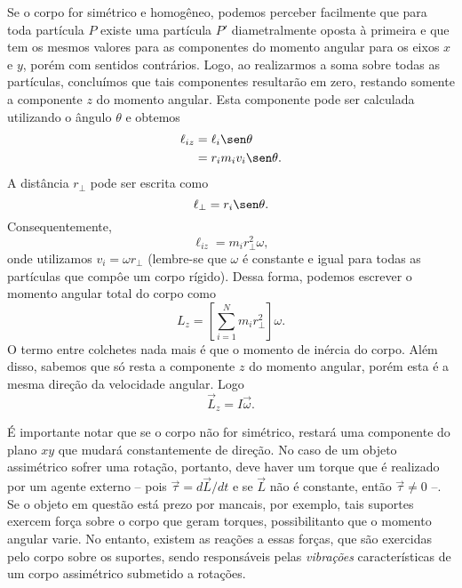 Se o corpo for simétrico e homogêneo, podemos perceber facilmente que para toda partícula $P$ existe uma partícula $P'$ diametralmente oposta à primeira e que tem os mesmos valores para as componentes do momento angular para os eixos $x$ e $y$, porém com sentidos contrários. Logo, ao realizarmos a soma sobre todas as partículas, concluímos que tais componentes resultarão em zero, restando somente a componente $z$ do momento angular. Esta componente pode ser calculada utilizando o ângulo $\theta$ e obtemos
\begin{align}
  \ell_{iz} &= \ell_i \sen\theta \\
  &= r_i m_i v_i \sen\theta.
\end{align}
%
A distância $r_{\perp}$ pode ser escrita como
\begin{equation}
  \ell_{\perp} = r_i\sen\theta.
\end{equation}
%
Consequentemente, 
\begin{equation}
  \ell_{iz} = m_i r_{\perp}^2 \omega,
\end{equation}
%
onde utilizamos $v_i = \omega r_{\perp}$ (lembre-se que $\omega$ é constante e igual para todas as partículas que compôe um corpo rígido). Dessa forma, podemos escrever o momento angular total do corpo como
\begin{equation}
  L_z = \left[\sum_{i=1}^N m_i r_{\perp}^2\right] \omega.
\end{equation}
%
O termo entre colchetes nada mais é que o momento de inércia do corpo. Além disso, sabemos que só resta a componente $z$ do momento angular, porém esta é a mesma direção da velocidade angular. Logo
\begin{equation}
  \vec{L}_z = I \vec{\omega}.
\end{equation}

É importante notar que se o corpo não for simétrico, restará uma componente do plano $xy$ que mudará constantemente de direção. No caso de um objeto assimétrico sofrer uma rotação, portanto, deve haver um torque que é realizado por um agente externo -- pois $\vec{\tau} = d\vec{L} / dt$ e se $\vec{L}$ não é constante, então $\vec{\tau} \neq 0$ --. Se o objeto em questão está prezo por mancais, por exemplo, tais suportes exercem força sobre o corpo que geram torques, possibilitanto que o momento angular varie. No entanto, existem as reações a essas forças, que são exercidas pelo corpo sobre os suportes, sendo responsáveis pelas \emph{vibrações} características de um corpo assimétrico submetido a rotações.

